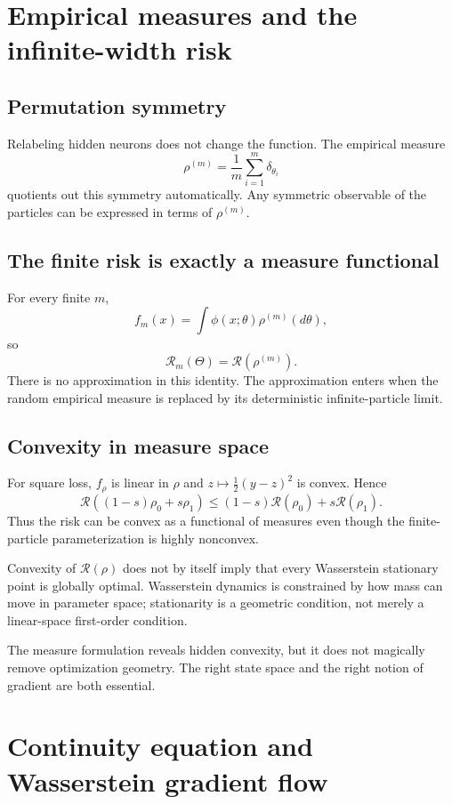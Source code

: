 \documentclass[11pt,a4paper,oneside,openany]{memoir}
\theoremstyle{definition}
\begin{document}
\chapter{Empirical measures and the infinite-width risk}
\section{Permutation symmetry}
Relabeling hidden neurons does not change the function.  The empirical measure
\[
\rho^{(m)}=\frac1m\sum_{i=1}^m\delta_{\theta_i}
\]
quotients out this symmetry automatically.  Any symmetric observable of the particles can be expressed in terms of $\rho^{(m)}$.

\section{The finite risk is exactly a measure functional}
For every finite $m$,
\[
f_m(x)=\int\phi(x;\theta)\rho^{(m)}(d\theta),
\]
so
\[
\mathcal R_m(\Theta)=\mathcal R(\rho^{(m)}).
\]
There is no approximation in this identity.  The approximation enters when the random empirical measure is replaced by its deterministic infinite-particle limit.

\section{Convexity in measure space}
For square loss, $f_\rho$ is linear in $\rho$ and $z\mapsto \frac12(y-z)^2$ is convex.  Hence
\[
\mathcal R((1-s)\rho_0+s\rho_1)
\le (1-s)\mathcal R(\rho_0)+s\mathcal R(\rho_1).
\]
Thus the risk can be convex as a functional of measures even though the finite-particle parameterization is highly nonconvex.

\begin{warningbox}
Convexity of $\mathcal R(\rho)$ does not by itself imply that every Wasserstein stationary point is globally optimal.  Wasserstein dynamics is constrained by how mass can move in parameter space; stationarity is a geometric condition, not merely a linear-space first-order condition.
\end{warningbox}

\begin{presentbox}
The measure formulation reveals hidden convexity, but it does not magically remove optimization geometry.  The right state space and the right notion of gradient are both essential.
\end{presentbox}

\chapter{Continuity equation and Wasserstein gradient flow}
\end{document}
